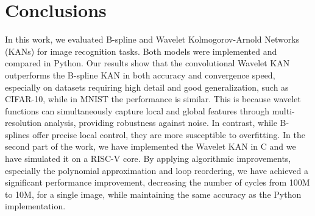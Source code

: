\documentclass[11pt,a4paper,twocolumn]{article}
\begin{document}
\section{Conclusions}
\label{sec:conclusions}
In this work, we evaluated B-spline and Wavelet Kolmogorov-Arnold Networks (KANs) 
for image recognition tasks. Both models were implemented and compared in 
Python. Our results show that the convolutional Wavelet KAN outperforms the 
B-spline KAN in both accuracy and convergence speed, especially on datasets 
requiring high detail and good generalization, such as CIFAR-10, while in MNIST the performance is similar. 
This is because wavelet functions can simultaneously capture local and global features 
through multi-resolution analysis, providing robustness against noise. 
In contrast, while B-splines offer precise local control, they are more susceptible 
to overfitting.
In the second part of the work, we have implemented the Wavelet KAN in C and we have 
simulated it on a RISC-V core. By applying algorithmic improvements, especially the polynomial approximation and loop reordering, 
we have achieved a significant performance improvement, decreasing the number of cycles from 100M to 10M, for a single image,
while maintaining the same accuracy as the Python implementation.


\end{document}

